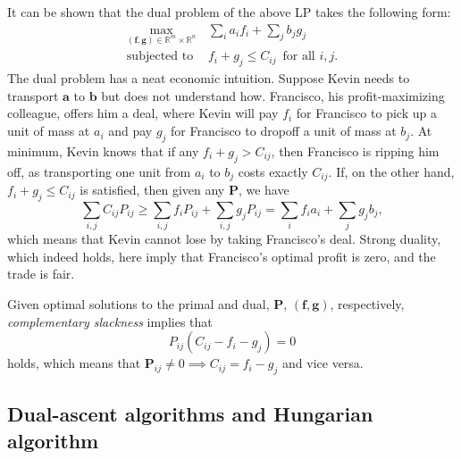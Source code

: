 \documentclass[11pt,reqno]{amsart}
\newcommand{\R}{\mathbb{R}}
\renewcommand{\b}{\mathbf}
\theoremstyle{definition}
\theoremstyle{remark}
\begin{document}
It can be shown that the dual problem of the above LP takes the following
form: \begin{align*}
\max_{(\b f, \b g) \in \R^{m} \times \R^n} \, & \sum_i a_i f_i + \sum_j b_j
g_j
\\ 
\text{subjected to } & f_i + g_j \le C_{ij}\, \text{ for all $i,j$}.
\end{align*}
The dual problem has a neat economic intuition. Suppose Kevin needs to
transport $\b a$ to $\b b$ but does not understand how. Francisco, his
profit-maximizing colleague, offers him a deal, where Kevin will pay $f_i$
for Francisco to
pick up a unit of mass at $a_i$ and pay $g_j$ for Francisco to dropoff a
unit of mass at $b_j.$ At minimum, Kevin knows that if any $f_i + g_j > C_
{ij}$, then Francisco is ripping him off, as transporting one unit from
$a_i$ to $b_j$ costs exactly $C_{ij}$. If, on the other hand, $f_i + g_j
\le C_{ij}$ is satisfied, then given any $\b P$, we have \[
\sum_{i,j} C_{ij}P_{ij} \ge \sum_{i,j} f_i P_{ij} + \sum_{i,j} g_j P_{ij} =
\sum_i f_i a_i + \sum_j g_j b_j \tag{Weak duality},
\]
which means that Kevin cannot lose by taking Francisco's deal. Strong
duality, which indeed holds, here imply that Francisco's optimal profit is
zero, and the trade is fair.


Given optimal solutions to the primal and dual, $\b P$, $(\b f, \b g)$,
respectively, \emph{complementary slackness} implies that \[
P_{ij} (C_{ij} - f_i - g_j) = 0 \tag{Complementary slackness}
\]
holds, which means that $\b P_{ij} \neq 0 \implies C_{ij} = f_i - g_j$ and
vice versa. 
    
\subsection{Dual-ascent algorithms and Hungarian algorithm}
\end{document}
